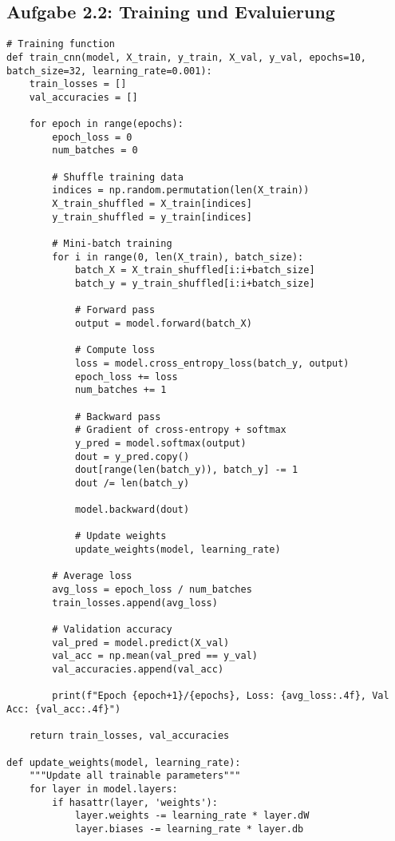 ﻿\documentclass[12pt,a4paper]{article}
\begin{document}
\subsection{Aufgabe 2.2: Training und Evaluierung}

\begin{lstlisting}
# Training function
def train_cnn(model, X_train, y_train, X_val, y_val, epochs=10, batch_size=32, learning_rate=0.001):
    train_losses = []
    val_accuracies = []
    
    for epoch in range(epochs):
        epoch_loss = 0
        num_batches = 0
        
        # Shuffle training data
        indices = np.random.permutation(len(X_train))
        X_train_shuffled = X_train[indices]
        y_train_shuffled = y_train[indices]
        
        # Mini-batch training
        for i in range(0, len(X_train), batch_size):
            batch_X = X_train_shuffled[i:i+batch_size]
            batch_y = y_train_shuffled[i:i+batch_size]
            
            # Forward pass
            output = model.forward(batch_X)
            
            # Compute loss
            loss = model.cross_entropy_loss(batch_y, output)
            epoch_loss += loss
            num_batches += 1
            
            # Backward pass
            # Gradient of cross-entropy + softmax
            y_pred = model.softmax(output)
            dout = y_pred.copy()
            dout[range(len(batch_y)), batch_y] -= 1
            dout /= len(batch_y)
            
            model.backward(dout)
            
            # Update weights
            update_weights(model, learning_rate)
        
        # Average loss
        avg_loss = epoch_loss / num_batches
        train_losses.append(avg_loss)
        
        # Validation accuracy
        val_pred = model.predict(X_val)
        val_acc = np.mean(val_pred == y_val)
        val_accuracies.append(val_acc)
        
        print(f"Epoch {epoch+1}/{epochs}, Loss: {avg_loss:.4f}, Val Acc: {val_acc:.4f}")
    
    return train_losses, val_accuracies

def update_weights(model, learning_rate):
    """Update all trainable parameters"""
    for layer in model.layers:
        if hasattr(layer, 'weights'):
            layer.weights -= learning_rate * layer.dW
            layer.biases -= learning_rate * layer.db


\end{lstlisting}
\end{document}
